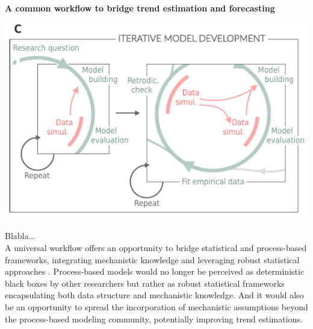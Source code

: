 \documentclass[11pt]{article}
\begin{document}
\begin{tcolorbox}
\centerline{\bf A common workflow to bridge trend estimation and forecasting} %
\vspace*{-3mm}
{\begin{multicols}{2}
\begin{minipage}[t]{\linewidth}
\includegraphics[width=\linewidth]{figures/iterativeworkflow_details}
    
\vspace*{1mm}
\end{minipage}

\columnbreak
\vspace*{1mm}
Blabla... \\
A universal workflow offers an opportunity to bridge statistical and process-based frameworks, integrating mechanistic knowledge and leveraging robust statistical approaches \citep[e.g.][]{rounce2020quantifying}. Process-based models would no longer be perceived as deterministic black boxes by other researchers but rather as robust statistical frameworks encapsulating both data structure and mechanistic knowledge. And it would also be an opportunity to spread the incorporation of mechanistic assumptions beyond the process-based modeling community, potentially improving trend estimations.

\end{multicols}}

\end{tcolorbox}
\end{document}

